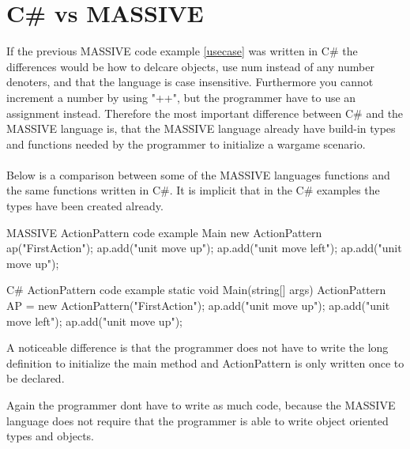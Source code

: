 \section{C\# vs MASSIVE}
If the previous MASSIVE code example \ref{usecase} was written in C\# the differences would be how to delcare objects, use num instead of any number denoters, and that the language is case insensitive. Furthermore you cannot increment a number by using "++", but the programmer have to use an assignment instead.
Therefore the most important difference between C\# and the MASSIVE language is, that the MASSIVE language already have build-in types and functions needed by the programmer to initialize a wargame scenario.\\
\\
Below is a comparison between some of the MASSIVE languages functions and the same functions written in C\#. It is implicit that in the C\# examples the types have been created already.\\

\begin{source}{MASSIVE ActionPattern code example}{}                    
	Main
	{
	new ActionPattern ap("FirstAction");
	ap.add("unit move up");
	ap.add("unit move left");
	ap.add("unit move up");
	}
\end{source}

\begin{source}{C\# ActionPattern code example}{}                    
static void Main(string[] args)
    {
        ActionPattern AP = new ActionPattern("FirstAction");
				ap.add("unit move up");
				ap.add("unit move left");
				ap.add("unit move up");
    }
\end{source}

A noticeable difference is that the programmer does not have to write the long definition to initialize the main method and ActionPattern is only written once to be declared.




Again the programmer dont have to write as much code, because the MASSIVE language does not require that the programmer is able to write object oriented types and objects.
